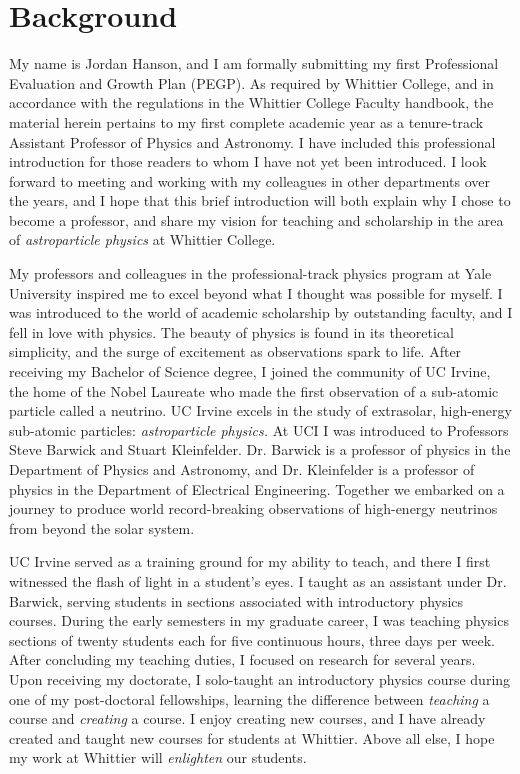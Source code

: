 \documentclass[../../main.tex]{subfiles}
\begin{document}
\section{Background}

My name is Jordan Hanson, and I am formally submitting my first Professional Evaluation and Growth Plan (PEGP).  As required by Whittier College, and in accordance with the regulations in the Whittier College Faculty handbook, the material herein pertains to my first complete academic year as a tenure-track Assistant Professor of Physics and Astronomy.  I have included this professional introduction for those readers to whom I have not yet been introduced.  I look forward to meeting and working with my colleagues in other departments over the years, and I hope that this brief introduction will both explain why I chose to become a professor, and share my vision for teaching and scholarship in the area of \textit{astroparticle physics} at Whittier College. \\ \hspace{0.1cm}

My professors and colleagues in the professional-track physics program at Yale University inspired me to excel beyond what I thought was possible for myself.  I was introduced to the world of academic scholarship by outstanding faculty, and I fell in love with physics.  The beauty of physics is found in its theoretical simplicity, and the surge of excitement as observations spark to life.  After receiving my Bachelor of Science degree, I joined the community of UC Irvine, the home of the Nobel Laureate who made the first observation of a sub-atomic particle called a neutrino.  UC Irvine excels in the study of extrasolar, high-energy sub-atomic particles: \textit{astroparticle physics.}  At UCI I was introduced to Professors Steve Barwick and Stuart Kleinfelder.  Dr. Barwick is a professor of physics in the Department of Physics and Astronomy, and Dr. Kleinfelder is a professor of physics in the Department of Electrical Engineering.  Together we embarked on a journey to produce world record-breaking observations of high-energy neutrinos from beyond the solar system. \\ \hspace{0.1cm}

UC Irvine served as a training ground for my ability to teach, and there I first witnessed the flash of light in a student's eyes.  I taught as an assistant under Dr. Barwick, serving students in sections associated with introductory physics courses.  During the early semesters in my graduate career, I was teaching physics sections of twenty students each for five continuous hours, three days per week.  After concluding my teaching duties, I focused on research for several years.  Upon receiving my doctorate, I solo-taught an introductory physics course during one of my post-doctoral fellowships, learning the difference between \textit{teaching} a course and \textit{creating} a course.  I enjoy creating new courses, and I have already created and taught new courses for students at Whittier.  Above all else, I hope my work at Whittier will \textit{enlighten} our students.
\end{document}
